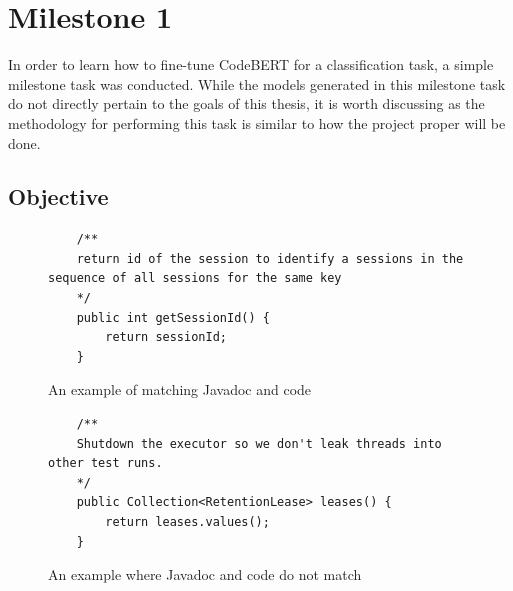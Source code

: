 
\chapter[Abbreviated title]{Milestone 1}
\label{Chap:label}	%
\pagestyle{headings}


\noindent
In order to learn how to fine-tune CodeBERT for a classification task, a simple milestone task was conducted. While the models generated in this milestone task do not directly pertain to the goals of this thesis, it is worth discussing as the methodology for performing this task is similar to how the project proper will be done.\\

\section{Objective}

\begin{figure}
	\label{codematches}
	\begin{lstlisting}
	/**
	return id of the session to identify a sessions in the sequence of all sessions for the same key
	*/
	public int getSessionId() {
 		return sessionId;
	}
	\end{lstlisting}
	\caption{An example of matching Javadoc and code}
\end{figure}

\begin{figure}
	\label{test}
	\begin{lstlisting}
	/**
	Shutdown the executor so we don't leak threads into other test runs.
	*/
	public Collection<RetentionLease> leases() { 
		return leases.values();
	}
	\end{lstlisting}
	\caption{An example where Javadoc and code do not match}
\end{figure}




